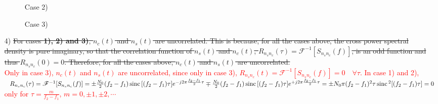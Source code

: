 \documentclass{assignment}
\begin{document}
\begin{sol}
\begin{itemize}
\begin{figure}[h]
            \caption{Case 2)}
            \caption{Case 3)}
        \end{figure}
        \item[4)] \sout{For cases \textbf{1), 2) and 3)}, $n_c(t)$ and $n_s(t)$ are uncorrelated. This is because, for all the cases above, the cross power spectral density is pure imaginary, so that the correlation function of $n_s(t)$ and $n_c(t)$, $R_{n_sn_c}(\tau)=\mathscr{F}^{-1}[S_{n_sn_c}(f)]$, is an odd function and thus $R_{n_sn_c}(0)=0$. Therefore, for all the cases above, $n_c(t)$ and $n_s(t)$ are uncorrelated.}\\
        \textcolor{red}{Only in case 3), $n_c(t)$ and $n_s(t)$ are uncorrelated, since only in case 3), $R_{n_sn_c}(t)=\mathscr{F}^{-1}[S_{n_sn_c}(f)]=0\quad\forall\tau$. In case 1) and 2), $R_{n_sn_c}(\tau)=\mathscr{F}^{-1}[S_{n_sn_c}(f)]=\pm\frac{N_0}{2}(f_2-f_1)\,\text{sinc}\,[(f_2-f_1)\tau]e^{-j2\pi\frac{f_2-f_1}{2}\tau}\mp\frac{N_0}{2}(f_2-f_1)\,\text{sinc}\,[(f_2-f_1)\tau]e^{+j2\pi\frac{f_2-f_1}{2}\tau}=\pm N_0\pi(f_2-f_1)^2\tau\,\text{sinc}\,^2[(f_2-f_1)\tau]=0$ only for $\tau=\frac{m}{f_2-f_1}$, $m=0,\pm 1,\pm 2,\cdots$}
    \end{itemize}
\end{sol}
\end{document}

